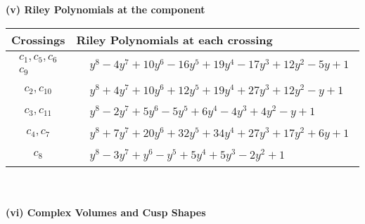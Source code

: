 \documentclass[1p]{elsarticle_modified}
\theoremstyle{definition}
\begin{document}
\newpage\renewcommand{\arraystretch}{1}
\flushleft \textbf{(v) Riley Polynomials at the component}\newline \\
\begin{tabular}{m{50pt}|m{274pt}}
Crossings & \hspace{64pt}Riley Polynomials at each crossing \\
\hline $$\begin{aligned}c_{1},c_{5},c_{6}\\c_{9}\end{aligned}$$&$\begin{aligned}
&y^8-4 y^7+10 y^6-16 y^5+19 y^4-17 y^3+12 y^2-5 y+1
\end{aligned}$\\
\hline $$\begin{aligned}c_{2},c_{10}\end{aligned}$$&$\begin{aligned}
&y^8+4 y^7+10 y^6+12 y^5+19 y^4+27 y^3+12 y^2- y+1
\end{aligned}$\\
\hline $$\begin{aligned}c_{3},c_{11}\end{aligned}$$&$\begin{aligned}
&y^8-2 y^7+5 y^6-5 y^5+6 y^4-4 y^3+4 y^2- y+1
\end{aligned}$\\
\hline $$\begin{aligned}c_{4},c_{7}\end{aligned}$$&$\begin{aligned}
&y^8+7 y^7+20 y^6+32 y^5+34 y^4+27 y^3+17 y^2+6 y+1
\end{aligned}$\\
\hline $$\begin{aligned}c_{8}\end{aligned}$$&$\begin{aligned}
&y^8-3 y^7+y^6- y^5+5 y^4+5 y^3-2 y^2+1
\end{aligned}$\\
\hline
\end{tabular}\\~\\
\newpage\flushleft \textbf{(vi) Complex Volumes and Cusp Shapes}
\end{document}
